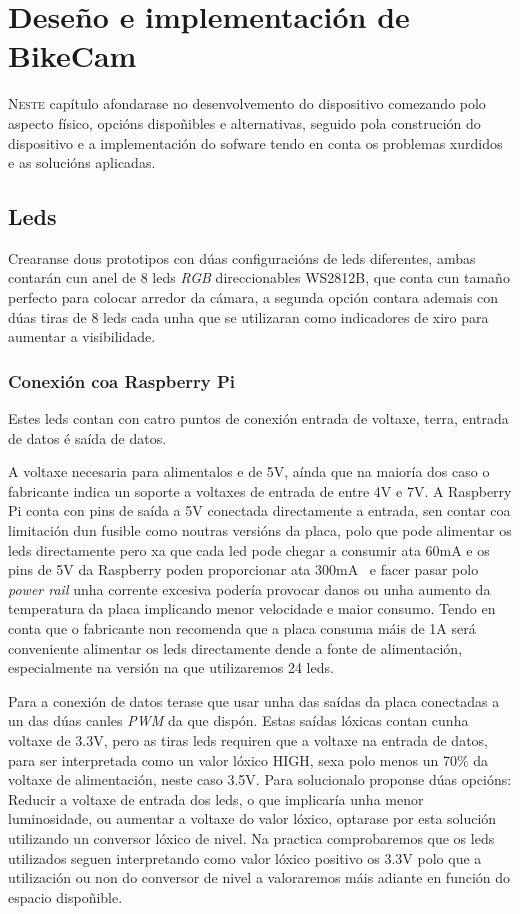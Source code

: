 \chapter{Deseño e implementación de BikeCam}
\label{chap:implementacion_dispositivo}
\lettrine{N}{este} capítulo afondarase no desenvolvemento do dispositivo comezando polo aspecto físico, opcións dispoñibles e alternativas, seguido pola construción do dispositivo e a implementación do sofware tendo en conta os problemas xurdidos e as solucións aplicadas.


\section{Leds}

Crearanse dous prototipos con dúas configuracións de leds diferentes, ambas contarán cun anel de 8 leds \emph{RGB} direccionables WS2812B, que conta cun tamaño perfecto para colocar arredor da cámara, a segunda opción contara ademais con dúas tiras de 8 leds cada unha que se utilizaran como indicadores de xiro para aumentar a visibilidade.
\subsection{Conexión coa Raspberry Pi}
Estes leds contan con catro puntos de conexión entrada de voltaxe, terra, entrada de datos é saída de datos.

A voltaxe necesaria para alimentalos e de 5V, aínda que na maioría dos caso o fabricante indica un soporte a voltaxes de entrada de entre 4V e 7V. A Raspberry Pi conta con pins de saída a 5V conectada directamente a entrada, sen contar coa limitación dun fusible como noutras versións da placa, polo que pode alimentar os leds directamente pero xa que cada led pode chegar a consumir ata 60mA e os pins de 5V da Raspberry poden proporcionar ata 300mA~\cite{molloyRaspberryPiFondo2018} e facer pasar polo \emph{power rail} unha corrente excesiva podería provocar danos ou unha aumento da temperatura da placa implicando menor velocidade e maior consumo. Tendo en conta que o fabricante non recomenda que a placa consuma máis de 1A será conveniente alimentar os leds directamente dende a fonte de alimentación, especialmente na versión na que utilizaremos 24 leds.

Para a conexión de datos terase que usar unha das saídas da placa conectadas a un das dúas canles \emph{PWM} da que dispón. Estas saídas lóxicas contan cunha voltaxe de 3.3V, pero as tiras leds requiren que a voltaxe na entrada de datos, para ser interpretada como un valor lóxico HIGH, sexa polo menos un 70\(\%\) da  voltaxe de alimentación, neste caso 3.5V. Para solucionalo proponse dúas opcións: Reducir a voltaxe de entrada dos leds, o que implicaría unha menor luminosidade, ou aumentar a voltaxe do valor lóxico, optarase por esta solución utilizando un conversor lóxico de nivel. Na practica comprobaremos que os leds utilizados seguen interpretando como valor lóxico positivo os 3.3V polo que a utilización ou non do conversor de nivel a valoraremos máis adiante en función do espacio dispoñible.

